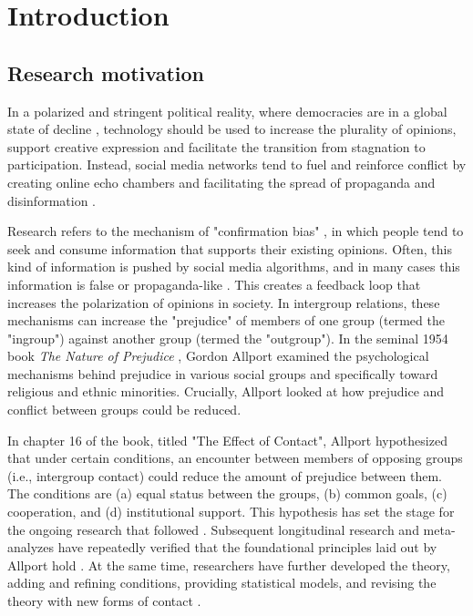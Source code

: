 \documentclass[dissertation,math,vertlayout,pdfa,colorlinks]{aaltoseries}
\begin{document}
\chapter{Introduction}
\section{Research motivation}
In a polarized and stringent political reality, where democracies are in a global state of decline \cite{nordDemocracyReport20252025}, technology should be used to increase the plurality of opinions, support creative expression and facilitate the transition from stagnation to participation. Instead, social media networks tend to fuel and reinforce conflict by creating online echo chambers and facilitating the spread of propaganda and disinformation \cite{xingDivingDivideSystematic2024}.

Research refers to the mechanism of "confirmation bias" \cite{knobloch-westerwickConfirmationBiasIngroup2020}, in which people tend to seek and consume information that supports their existing opinions. Often, this kind of information is pushed by social media algorithms, and in many cases this information is false or propaganda-like \cite{eckerDigitalReinforcementBias2025}. This creates a feedback loop that increases the polarization of opinions in society. In intergroup relations, these mechanisms can increase the "prejudice" of members of one group (termed the "ingroup") against another group (termed the "outgroup"). In the seminal 1954 book \textit{The Nature of Prejudice} \cite{allportNaturePrejudice1954}, Gordon Allport examined the psychological mechanisms behind prejudice in various social groups and specifically toward religious and ethnic minorities. Crucially, Allport looked at how prejudice and conflict between groups could be reduced. 

In chapter 16 of the book, titled "The Effect of Contact", Allport hypothesized that under certain conditions, an encounter between members of opposing groups (i.e., intergroup contact) could reduce the amount of prejudice between them. The conditions are (a) equal status between the groups, (b) common goals, (c) cooperation, and (d) institutional support. This hypothesis has set the stage for the ongoing research that followed \cite{pettigrewAllportsIntergroupContact2005}. Subsequent longitudinal research and meta-analyzes have repeatedly verified that the foundational principles laid out by Allport hold \cite{pettigrewMetaanalyticTestIntergroup2006, pettigrewIntergroupContactTheory1998, pettigrewDoesIntergroupContact2013}. At the same time, researchers have further developed the theory, adding and refining conditions, providing statistical models, and revising the theory with new forms of contact \cite{pettigrewAdvancingIntergroupContact2021}.
\end{document}
